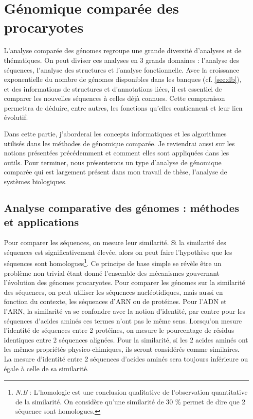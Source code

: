 \chapter{Génomique comparée des procaryotes}
\label{chap:comp}

L'analyse comparée des génomes regroupe une grande diversité d'analyses et de thématiques. On peut diviser ces analyses en 3 grands domaines : l'analyse des séquences, l'analyse des structures et l'analyse fonctionnelle.  Avec la croissance exponentielle du nombre de génomes disponibles dans les banques (cf. \autoref{sec:db}), et des informations de structures et d'annotations liées, il est essentiel de comparer les nouvelles séquences à celles déjà connues. Cette comparaison permettra de déduire, entre autres, les fonctions qu'elles contiennent et leur lien évolutif. 

Dans cette partie, j'aborderai les concepts informatiques et les algorithmes utilisés dans les méthodes de génomique comparée. Je reviendrai aussi sur les notions présentées précédemment et comment elles sont appliquées dans les outils. Pour terminer, nous présenterons un type d'analyse de génomique comparée qui est largement présent dans mon travail de thèse, l'analyse de systèmes biologiques.

\section{Analyse comparative des génomes : méthodes et applications}
\label{sec:comp_gen}

Pour comparer les séquences, on mesure leur similarité. Si la similarité des séquences est significativement élevée, alors on peut faire l'hypothèse que les séquences sont homologues\footnote{\textit{N.B} : L'homologie est une conclusion qualitative de l'observation quantitative de la similarité. On considère qu'une similarité de 30 \% permet de dire que 2 séquence sont homologues.}. Ce principe de base simple se révèle être un problème non trivial étant donné l'ensemble des mécanismes gouvernant l'évolution des génomes procaryotes. Pour comparer les génomes sur la similarité des séquences, on peut utiliser les séquences nucléotidiques, mais aussi en fonction du contexte, les séquences d'ARN ou de protéines. Pour l'ADN et l'ARN, la similarité va se confondre avec la notion d'identité, par contre pour les séquences d'acides aminés ces termes n'ont pas le même sens. Lorsqu'on mesure l'identité de séquences entre 2 protéines, on mesure le pourcentage de résidus identiques entre 2 séquences alignées. Pour la similarité, si les 2 acides aminés ont les mêmes propriétés physico-chimiques, ils seront considérés comme similaires. La mesure d'identité entre 2 séquences d'acides aminés sera toujours inférieure ou égale à celle de sa similarité.

